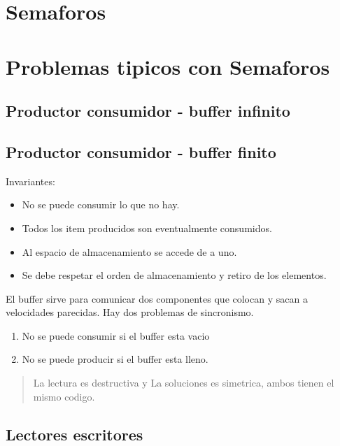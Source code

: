 \documentclass{article}
\begin{document}
\newpage{}
\tableofcontents
\newpage{}

\newpage
\section{Semaforos}

\section{Problemas tipicos con Semaforos}

\subsection{Productor consumidor - buffer infinito}



\newpage
\subsection{Productor consumidor - buffer finito}

Invariantes:
\begin{itemize}
    \item No se puede consumir lo que no hay.
    \item Todos los item producidos son eventualmente consumidos.
    \item Al espacio de almacenamiento se accede de a uno.
    \item Se debe respetar el orden de almacenamiento y retiro de los elementos.
\end{itemize}

El buffer sirve para comunicar dos componentes que colocan y sacan a velocidades parecidas.
Hay dos problemas de sincronismo.
\begin{enumerate}
    \item No se puede consumir si el buffer esta vacio
    \item No se puede producir si el buffer esta lleno. 
\end{enumerate}


\begin{quote}
    La lectura es destructiva y La soluciones es simetrica, ambos tienen el mismo codigo.        
\end{quote}

\newpage
\subsection{Lectores escritores}
\end{document}
